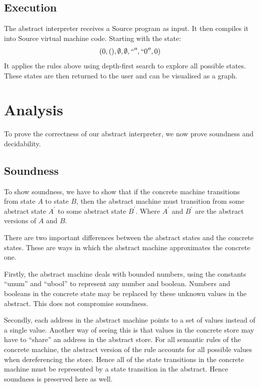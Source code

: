 \documentclass[12pt]{article}
\begin{document}
\subsection{Execution}
The abstract interpreter receives a Source program as input. It then compiles it into Source virtual machine code. Starting with the state:
$$(0,(),\emptyset,\emptyset,``'',``0'',0)$$
It applies the rules above using depth-first search to explore all possible states. These states are then returned to the user and can be visualised as a graph.

\section{Analysis}
To prove the correctness of our abstract interpreter, we now prove soundness and decidability.

\subsection{Soundness}
To show soundness, we have to show that if the concrete machine transitions from state $A$ to state $B$, then the abstract machine must transition from some abstract state $A^{\prime}$ to some abstract state $B^{\prime}$. Where $A^{\prime}$ and $B^{\prime}$ are the abstract versions of $A$ and $B$.

There are two important differences between the abstract states and the concrete states. These are ways in which the abstract machine approximates the concrete one.

Firstly, the abstract machine deals with bounded numbers, using the constants ``unum'' and ``ubool'' to represent any number and boolean. Numbers and booleans in the concrete state may be replaced by these unknown values in the abstract. This does not compromise soundness.

Secondly, each address in the abstract machine points to a set of values instead of a single value. Another way of seeing this is that values in the concrete store may have to ``share'' an address in the abstract store. For all semantic rules of the concrete machine, the abstract version of the rule accounts for all possible values when dereferencing the store. Hence all of the state transitions in the concrete machine must be represented by a state transition in the abstract. Hence soundness is preserved here as well.
\end{document}
